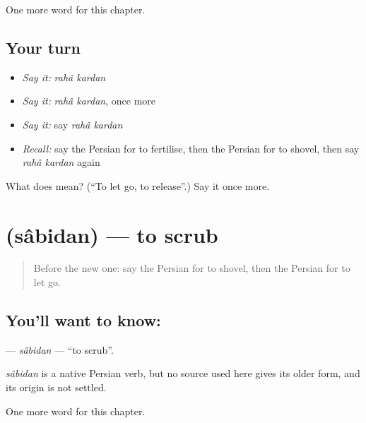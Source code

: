 \begin{grammarlens}[title={What you've built}]
One more word for this chapter.
\end{grammarlens}

\subsection*{Your turn}
\begin{itemize}
\raggedright
  \item \emph{Say it:} \emph{rahâ kardan}
  \item \emph{Say it:} \emph{rahâ kardan}, once more
  \item \emph{Say it:} say \emph{rahâ kardan}
  \item \emph{Recall:} say the Persian for to fertilise, then the Persian for to shovel, then say \emph{rahâ kardan} again
\end{itemize}

\begin{tcolorbox}[breakable,colback=teal!4,colframe=teal!35!black,title={Before you move on}]
What does   mean? (\textquotedblleft{}To let go, to release\textquotedblright{}.) Say it once more.
\end{tcolorbox}
\section[\texorpdfstring{\fa{سابیدن} (sâbidan)}{سابیدن (sâbidan)}]{ (sâbidan) — to scrub}

\label{lesson:FA-C226-sabidan}



\begin{quote}
Before the new one: say the Persian for to shovel, then the Persian for to let go.
\end{quote}

\subsection*{You'll want to know: }
\textbf{} — \emph{sâbidan} — \textquotedblleft{}to scrub\textquotedblright{}.

\begin{cousinweb}
\emph{sâbidan} is a native Persian verb, but no source used here gives its older form, and its origin is not settled.
\end{cousinweb}

\begin{grammarlens}[title={What you've built}]
One more word for this chapter.
\end{grammarlens}

